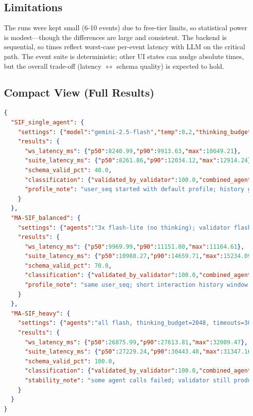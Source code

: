 \documentclass[openany]{book}
\begin{document}
\subsection*{Limitations}
The runs were kept small (6-10 events) due to free-tier limits, so statistical power is modest—though the differences are large and consistent. The backend is sequential, so times reflect worst-case per-event latency with LLM on the critical path. The event suite is deterministic; other UI states can nudge absolute times, but the overall trade-off (latency $\leftrightarrow$ schema quality) is expected to hold.

\subsection*{Compact View (Full Results)}
\begin{lstlisting}[language=json,caption={Condensed view of settings and outcomes per configuration.}]
{
  "SIF_single_agent": {
    "settings": {"model":"gemini-2.5-flash","temp":0.2,"thinking_budget":"dynamic","timeout":"api-default"},
    "results": {
      "ws_latency_ms": {"p50":8240.99,"p90":9913.63,"max":10649.21},
      "suite_latency_ms": {"p50":8261.86,"p90":12034.12,"max":12914.24},
      "schema_valid_pct": 40.0,
      "classification": {"validated_by_validator":100.0,"combined_agent_suggestions":0.0,"mock_rule_fallback":0.0},
      "profile_note": "user_seq started with default profile; history grew across events"
    }
  },
  "MA-SIF_balanced": {
    "settings": {"agents":"3x flash-lite (no thinking); validator flash (dynamic thinking, 30s)"},
    "results": {
      "ws_latency_ms": {"p50":9969.99,"p90":11151.80,"max":11164.61},
      "suite_latency_ms": {"p50":10988.27,"p90":14659.71,"max":15234.09},
      "schema_valid_pct": 70.0,
      "classification": {"validated_by_validator":100.0,"combined_agent_suggestions":0.0,"mock_rule_fallback":0.0},
      "profile_note": "same user_seq; short interaction history window provides context"
    }
  },
  "MA-SIF_heavy": {
    "settings": {"agents":"all flash, thinking_budget=2048, timeouts=30s, temps=0.2/0.3"},
    "results": {
      "ws_latency_ms": {"p50":26875.99,"p90":27613.81,"max":32009.47},
      "suite_latency_ms": {"p50":27229.24,"p90":30443.48,"max":31347.16},
      "schema_valid_pct": 100.0,
      "classification": {"validated_by_validator":100.0,"combined_agent_suggestions":0.0,"mock_rule_fallback":0.0},
      "stability_note": "some agent calls failed; validator still produced final valid list"
    }
  }
}
\end{lstlisting}
\end{document}
